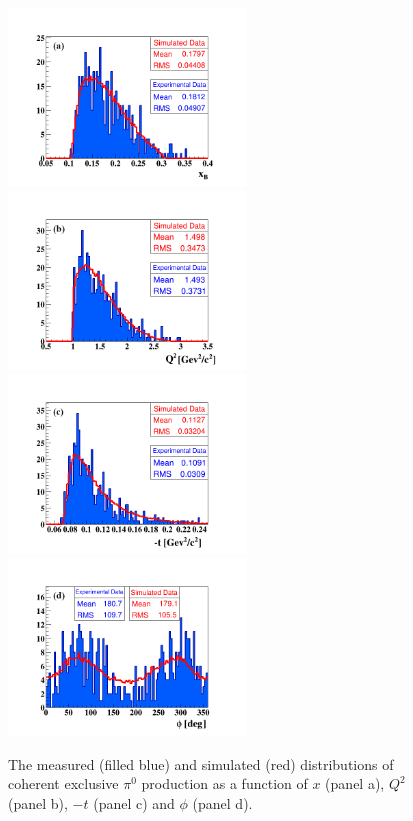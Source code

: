 \documentclass[aps,prc,preprint,superscriptaddress]{revtex4}
\begin{document}
\begin{figure}[p]
\center
\includegraphics[trim=70 15 70 70,clip,width=6.3cm]{xB_Coh_pi0.png}
\includegraphics[trim=70 15 70 70,clip,width=6.3cm]{Q2_Coh_pi0.png}
\includegraphics[trim=70 15 70 70,clip,width=6.3cm]{t_Coh_pi0.png}
\includegraphics[trim=70 15 70 70,clip,width=6.3cm]{phi_h_Coh_pi0.png}
	\caption{The measured (filled blue) and simulated (red) distributions of
	coherent exclusive $\pi^0$ production as a function of $x$ (panel a), 
        $Q^2$ (panel b), $-t$ (panel c) and $\phi$ (panel d).}
\label{fig:CohPi0Simul}
\end{figure}
\end{document}
